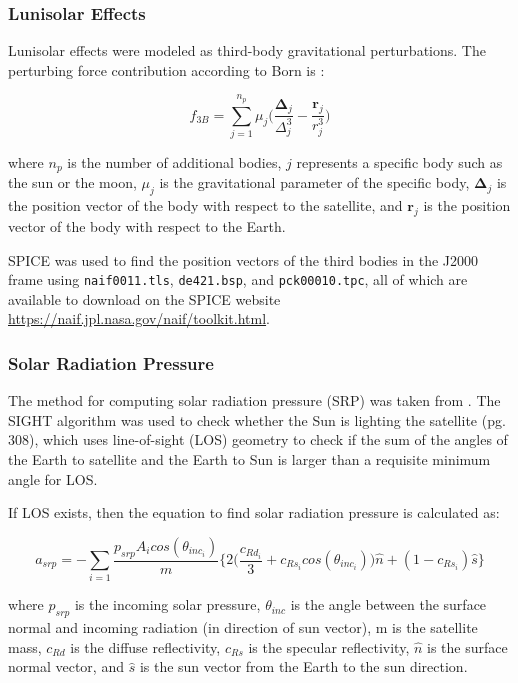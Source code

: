 \documentclass[conf]{new-aiaa}
\begin{document}
\subsubsection{Lunisolar Effects}

Lunisolar effects were modeled as third-body gravitational perturbations. The perturbing force contribution according to Born is \cite{born_statorbitdet}: 

\begin{equation}
	f_{3B} = \sum_{j=1}^{n_p} \mu_j \bigg( \dfrac{\pmb{\Delta}_{j}}{\Delta_j^3} - \dfrac{\pmb{r}_j}{r_j^3} \bigg)
\end{equation}

where $n_p$ is the number of additional bodies, $j$ represents a specific body such as the sun or the moon, $\mu_j$ is the gravitational parameter of the specific body, $\pmb{\Delta}_j$ is the position vector of the body with respect to the satellite, and $\pmb{r}_j$ is the position vector of the body with respect to the Earth. 

SPICE was used to find the position vectors of the third bodies in the J2000 frame using \texttt{naif0011.tls}, \texttt{de421.bsp}, and \texttt{pck00010.tpc}, all of which are available to download on the SPICE website \url{https://naif.jpl.nasa.gov/naif/toolkit.html}. 

\subsubsection{Solar Radiation Pressure}

The method for computing solar radiation pressure (SRP) was taken from \cite{vallado}. The SIGHT algorithm was used to check whether the Sun is lighting the satellite (pg. 308), which uses line-of-sight (LOS) geometry to check if the sum of the angles of the Earth to satellite and the Earth to Sun is larger than a requisite minimum angle for LOS. 

If LOS exists, then the equation to find solar radiation pressure is calculated as:

\begin{equation}
	a_{srp} = - \sum_{i = 1} \dfrac{p_{srp} A_i cos (\theta_{inc_i}) }{m} \bigg\{ 2 \bigg( \dfrac{c_{Rd_i}}{3} + c_{Rs}_i cos(\theta_{inc_i}) \bigg) \hat{n} + ( 1 - c_{Rs_i} ) \hat{s} \bigg\} 
\end{equation} 

where $p_{srp}$ is the incoming solar pressure, $\theta_{inc}$ is the angle between the surface normal and incoming radiation (in direction of sun vector), m is the satellite mass, $c_{Rd}$ is the diffuse reflectivity, $c_{Rs}$ is the specular reflectivity, $\hat{n}$ is the surface normal vector, and $\hat{s}$ is the sun vector from the Earth to the sun direction. 
\end{document}
